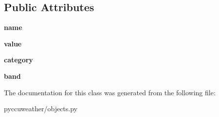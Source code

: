 \subsection*{Public Attributes}
\begin{DoxyCompactItemize}
\item 
\hypertarget{classpyccuweather_1_1objects_1_1_air_quality_factor_ad388f6fa1500cbe907e8ba5617ac57da}{}{\bfseries name}\label{classpyccuweather_1_1objects_1_1_air_quality_factor_ad388f6fa1500cbe907e8ba5617ac57da}

\item 
\hypertarget{classpyccuweather_1_1objects_1_1_air_quality_factor_a08a597e10fff0646c8c39b2aa24bb43b}{}{\bfseries value}\label{classpyccuweather_1_1objects_1_1_air_quality_factor_a08a597e10fff0646c8c39b2aa24bb43b}

\item 
\hypertarget{classpyccuweather_1_1objects_1_1_air_quality_factor_a0f77a25c68fd5038a2ffa5b299a59bf4}{}{\bfseries category}\label{classpyccuweather_1_1objects_1_1_air_quality_factor_a0f77a25c68fd5038a2ffa5b299a59bf4}

\item 
\hypertarget{classpyccuweather_1_1objects_1_1_air_quality_factor_a50ed11d0ea62a26199cc75fa55760525}{}{\bfseries band}\label{classpyccuweather_1_1objects_1_1_air_quality_factor_a50ed11d0ea62a26199cc75fa55760525}

\end{DoxyCompactItemize}


The documentation for this class was generated from the following file\+:\begin{DoxyCompactItemize}
\item 
pyccuweather/objects.\+py\end{DoxyCompactItemize}
